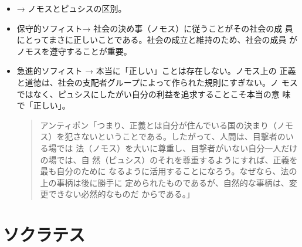 \documentclass[uplatex]{bxjsarticle}
\begin{document}
\begin{itemize}
\item → ノモスとピュシスの区別。

\item 保守的ソフィスト→ 社会の決め事（ノモス）に従うことがその社会の成
  員にとってまさに正しいことである。社会の成立と維持のため、社会の成員
  がノモスを遵守することが重要。

\item 急進的ソフィスト → 本当に「正しい」ことは存在しない。ノモス上の
  正義と道徳は、社会の支配者グループによって作られた規則にすぎない。ノ
  モスではなく、ピュシスにしたがい自分の利益を追求することこそ本当の意
  味で「正しい」。


  \begin{quote}
    アンティポン「つまり、正義とは自分が住んでいる国の決まり（ノモス）を犯さないということである。したがって、人間は、目撃者のいる場では
    法（ノモス）を大いに尊重し、目撃者がいない自分一人だけの場では、自
    然（ピュシス）のそれを尊重するようにすれば、正義を最も自分のために
    なるように活用することになろう。なぜなら、法の上の事柄は後に勝手に
    定められたものであるが、自然的な事柄は、変更できない必然的なものだ
    からである。」  \end{quote}


\end{itemize}

%


\section{ソクラテス}
\end{document}
